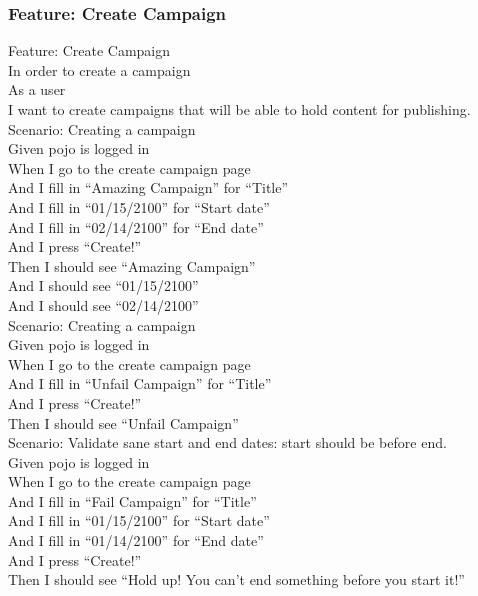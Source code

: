 \documentclass[12pt]{article}
\begin{document}
\subsubsection{Feature: Create Campaign}

Feature: Create Campaign \\
In order to create a campaign \\
As a user \\
I want to create campaigns that will be able to hold content for publishing. \\

Scenario: Creating a campaign \\
Given pojo is logged in \\
When I go to the create campaign page \\
And I fill in ``Amazing Campaign'' for ``Title'' \\
And I fill in ``01/15/2100'' for ``Start date'' \\
And I fill in ``02/14/2100'' for ``End date''   \\
And I press ``Create!'' \\
Then I should see ``Amazing Campaign'' \\
And I should see ``01/15/2100'' \\
And I should see ``02/14/2100'' \\

Scenario: Creating a campaign \\
Given pojo is logged in \\
When I go to the create campaign page \\
And I fill in ``Unfail Campaign'' for ``Title'' \\
And I press ``Create!'' \\
Then I should see ``Unfail Campaign'' \\

Scenario: Validate sane start and end dates: start should be before end. \\
Given pojo is logged in \\
When I go to the create campaign page \\
And I fill in ``Fail Campaign'' for ``Title'' \\
And I fill in ``01/15/2100'' for ``Start date'' \\
And I fill in ``01/14/2100'' for ``End date'' \\
And I press ``Create!'' \\
Then I should see ``Hold up! You can't end something before you start it!'' \\
\end{document}
